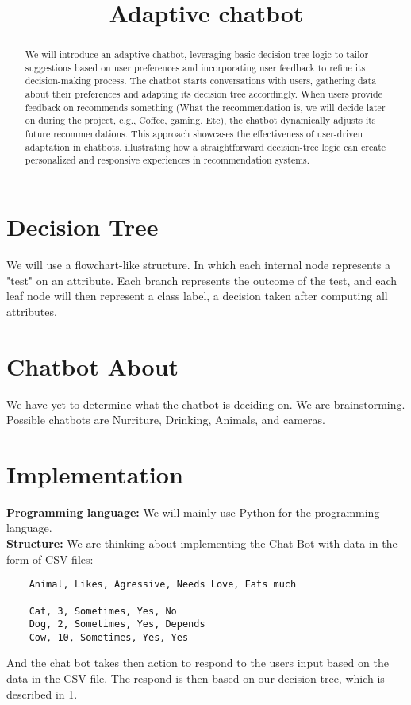 \documentclass{article}
\title{Adaptive chatbot}
\begin{document}
\maketitle


\begin{abstract}
   We will introduce an adaptive chatbot, leveraging basic decision-tree logic to tailor suggestions based on user preferences and incorporating user feedback to refine its decision-making process. The chatbot starts conversations with users, gathering data about their preferences and adapting its decision tree accordingly. When users provide feedback on recommends something (What the recommendation is, we will decide later on during the project, e.g., Coffee, gaming, Etc), the chatbot dynamically adjusts its future recommendations. This approach showcases the effectiveness of user-driven adaptation in chatbots, illustrating how a straightforward decision-tree logic can create personalized and responsive experiences in recommendation systems.
\end{abstract}


\section{Decision Tree}
We will use a flowchart-like structure. In which each internal node represents a "test" on an attribute. Each branch represents the outcome of the test, and each leaf node will then represent a class label, a decision taken after computing all attributes.

\section{Chatbot About}
We have yet to determine what the chatbot is deciding on. We are brainstorming. Possible chatbots are Nurriture, Drinking, Animals, and cameras.

\section{Implementation}
\textbf{Programming language:} We will mainly use Python for the programming language.\bigskip \\
\textbf{Structure:} We are thinking about implementing the Chat-Bot with data in the form of CSV files: 
\begin{verbatim}
    Animal, Likes, Agressive, Needs Love, Eats much
    
    Cat, 3, Sometimes, Yes, No
    Dog, 2, Sometimes, Yes, Depends 
    Cow, 10, Sometimes, Yes, Yes
\end{verbatim}
And the chat bot takes then action to respond to the users input based on the data in the CSV file. The respond is then based on our decision tree, which is described in 1.
\clearpage
\end{document}
